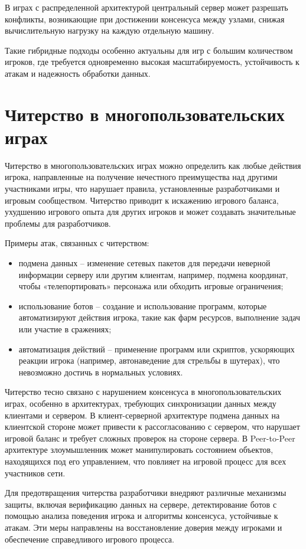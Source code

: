 В играх с распределенной архитектурой центральный сервер может разрешать конфликты, возникающие при достижении консенсуса между узлами, снижая вычислительную нагрузку на каждую отдельную машину.

Такие гибридные подходы особенно актуальны для игр с большим количеством игроков, где требуется одновременно высокая масштабируемость, устойчивость к атакам и надежность обработки данных.

\chapter{Читерство в многопользовательских играх}
Читерство в многопользовательских играх можно определить как любые действия игрока, направленные на получение нечестного преимущества над другими участниками игры, что нарушает правила, установленные разработчиками и игровым сообществом. Читерство приводит к искажению игрового баланса, ухудшению игрового опыта для других игроков и может создавать значительные проблемы для разработчиков.

Примеры атак, связанных с читерством:
\begin{itemize}
	\item подмена данных -- изменение сетевых пакетов для передачи неверной информации серверу или другим клиентам, например, подмена координат, чтобы «телепортировать» персонажа или обходить игровые ограничения;
	\item использование ботов -- создание и использование программ, которые автоматизируют действия игрока, такие как фарм ресурсов, выполнение задач или участие в сражениях;
	\item автоматизация действий -- применение программ или скриптов, ускоряющих реакции игрока (например, автонаведение для стрельбы в шутерах), что невозможно достичь в нормальных условиях.
\end{itemize}

Читерство тесно связано с нарушением консенсуса в многопользовательских играх, особенно в архитектурах, требующих синхронизации данных между клиентами и сервером. В клиент-серверной архитектуре подмена данных на клиентской стороне может привести к рассогласованию с сервером, что нарушает игровой баланс и требует сложных проверок на стороне сервера. В Peer-to-Peer архитектуре злоумышленник может манипулировать состоянием объектов, находящихся под его управлением, что повлияет на игровой процесс для всех участников сети.

Для предотвращения читерства разработчики внедряют различные механизмы защиты, включая верификацию данных на сервере, детектирование ботов с помощью анализа поведения игрока и алгоритмы консенсуса, устойчивые к атакам. Эти меры направлены на восстановление доверия между игроками и обеспечение справедливого игрового процесса.

